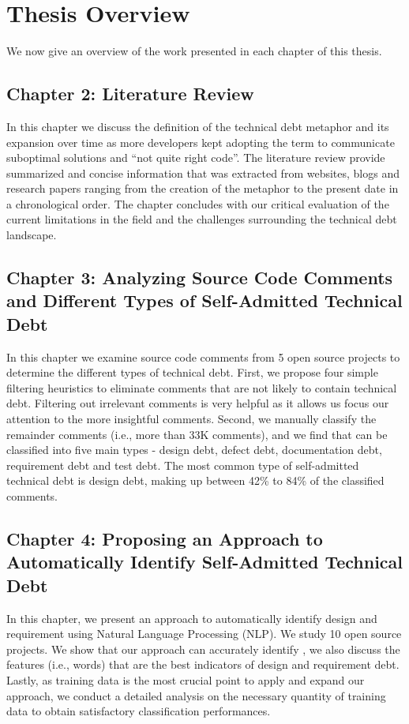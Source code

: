\section{Thesis Overview}

We now give an overview of the work presented in each chapter of this thesis.

\subsection{Chapter 2: Literature Review}

In this chapter we discuss the definition of the technical debt metaphor and its expansion over time as more developers kept adopting the term to communicate suboptimal solutions and ``not quite right code''. The literature review provide summarized and concise information that was extracted from websites, blogs and research papers ranging from the creation of the metaphor to the present date in a chronological order. The chapter concludes with our critical evaluation of the current limitations in the field and the challenges surrounding the technical debt landscape.

\subsection{Chapter 3: Analyzing Source Code Comments and Different Types of Self-Admitted Technical Debt}
    
In this chapter we examine source code comments from 5 open source projects to determine the different types of technical debt. First, we propose four simple filtering heuristics to eliminate comments that are not likely to contain technical debt. Filtering out irrelevant comments is very helpful as it allows us focus our attention to the more insightful comments. Second, we manually classify the remainder comments (i.e., more than 33K comments), and we find that \SATD can be classified into five main types - design debt, defect debt, documentation debt, requirement debt and test debt. The  most common type of self-admitted technical debt is design debt, making up between 42\% to 84\% of the classified comments.

\subsection{Chapter 4: Proposing an Approach to Automatically Identify Self-Admitted Technical Debt}

In this chapter, we present an approach to automatically identify design and requirement \SATD using Natural Language Processing (NLP). We study 10 open source projects. We show that our approach can accurately identify \SATD, we also discuss the features (i.e., words) that are the best indicators of design and requirement debt. Lastly, as training data is the most crucial point to apply and expand our approach, we conduct a detailed analysis on the necessary quantity of training data to obtain satisfactory classification performances.

